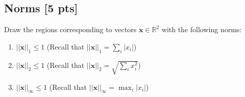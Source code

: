 \documentclass[a4paper]{article}
\theoremstyle{definition}
\newcommand{\RR}{\mathbb{R}}
\newenvironment{soln}{
	\leavevmode\color{blue}\ignorespaces
}{}
\begin{document}
	
	\subsection{Norms [5 pts]}
	Draw the regions corresponding to vectors $\mathbf{x}\in\RR^2$ with the following norms:
	\begin{enumerate}
		\item 	$||\mathbf{x}||_1\leq 1$ (Recall that $||\mathbf{x}||_1 = \sum_i |x_i|$)

	\begin{soln}
	\end{soln}
		
		\item 	$||\mathbf{x}||_2 \leq 1$ (Recall that $||\mathbf{x}||_2 =\sqrt{\sum_i x_i^2}$)
			\begin{soln}
				
		\end{soln}
		\item 	$||\mathbf{x}||_\infty \leq 1$ (Recall that $||\mathbf{x}||_\infty = \max_i |x_i|$)
			\begin{soln}
				

\end{soln}
\end{enumerate}
\end{document}
